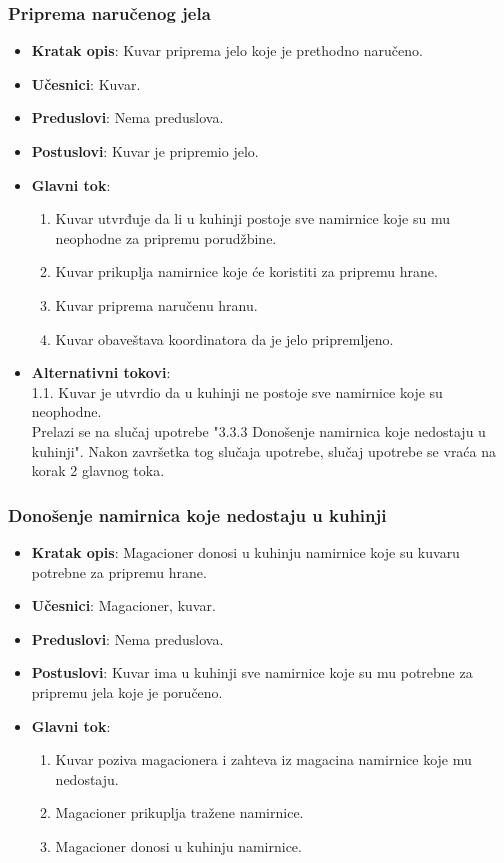\subsubsection{Priprema naručenog jela}
\begin{itemize}
    \item \textbf{Kratak opis}:
    Kuvar priprema jelo koje je prethodno naručeno.
    \item \textbf{Učesnici}:
    Kuvar.
    \item \textbf{Preduslovi}:
    Nema preduslova.
    \item \textbf{Postuslovi}:
    Kuvar je pripremio jelo.
    \item \textbf{Glavni tok}:
   \begin{enumerate}
        \item Kuvar utvrđuje da li u kuhinji postoje sve namirnice koje
        su mu neophodne za pripremu porudžbine.
        \item Kuvar prikuplja namirnice koje će koristiti za pripremu hrane.
        \item Kuvar priprema naručenu hranu.
        \item Kuvar obaveštava koordinatora da je
        jelo pripremljeno.
\end{enumerate}
 \item \textbf{Alternativni tokovi}:\\
     1.1. Kuvar je utvrdio da u kuhinji ne postoje
     sve namirnice koje su neophodne.
     \\ Prelazi se na slučaj
    upotrebe "3.3.3 Donošenje namirnica koje nedostaju u kuhinji". Nakon završetka tog slučaja upotrebe, slučaj upotrebe se
    vraća na korak 2 glavnog toka. 
\end{itemize}

\subsubsection{Donošenje namirnica koje nedostaju u kuhinji}
\begin{itemize}
    \item \textbf{Kratak opis}:
    Magacioner donosi u kuhinju namirnice koje su kuvaru potrebne za pripremu hrane.
    \item \textbf{Učesnici}:
    Magacioner, kuvar.
    \item \textbf{Preduslovi}:
    Nema preduslova.
    \item \textbf{Postuslovi}:
    Kuvar ima u kuhinji sve namirnice koje su mu potrebne za pripremu jela koje je poručeno.
    \item \textbf{Glavni tok}:
   \begin{enumerate}
        \item Kuvar poziva magacionera i zahteva iz magacina namirnice koje mu nedostaju.
        \item Magacioner prikuplja tražene namirnice.
        \item Magacioner donosi u kuhinju namirnice.
\end{enumerate}
\end{itemize}

